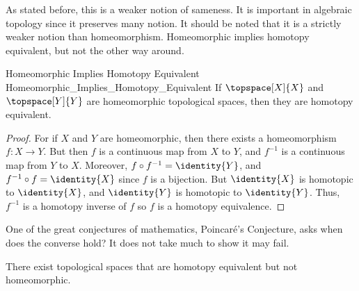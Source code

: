 \documentclass{book}                                                           %
\begin{document}
                As stated before, this is a weaker notion of sameness. It is
                important in algebraic topology since it preserves many notion.
                It should be noted that it is a strictly weaker notion than
                homeomorphism. Homeomorphic implies homotopy equivalent, but not
                the other way around.
                \begin{ltheorem}{Homeomorphic Implies Homotopy Equivalent}
                                {Homeomorphic_Implies_Homotopy_Equivalent}
                    If $\topspace[X]{X}$ and $\topspace[Y]{Y}$ are homeomorphic
                    topological spaces, then they are homotopy equivalent.
                \end{ltheorem}
                \begin{proof}
                    For if $X$ and $Y$ are homeomorphic, then there exists a
                    homeomorphism $f:X\rightarrow{Y}$. But then $f$ is a
                    continuous map from $X$ to $Y$, and $f^{-1}$ is a continuous
                    map from $Y$ to $X$. Moreover,
                    ${f}\circ{f^{-1}}=\identity{Y}$, and
                    ${f^{-1}}\circ{f}=\identity{X}$ since $f$ is a bijection.
                    But $\identity{X}$ is homotopic to $\identity{X}$, and
                    $\identity{Y}$ is homotopic to $\identity{Y}$. Thus,
                    $f^{\minus{1}}$ is a homotopy inverse of $f$ so $f$ is a
                    homotopy equivalence.
                \end{proof}
                One of the great conjectures of mathematics, Poincar\'{e}'s
                Conjecture, asks when does the converse hold?
                It does not take much to show it may fail.
                \begin{theorem}
                    \label{thm:homotopic_does_not_imply_homeomorphic}%
                    There exist topological spaces that are homotopy equivalent
                    but not homeomorphic.
                \end{theorem}
\end{document}
